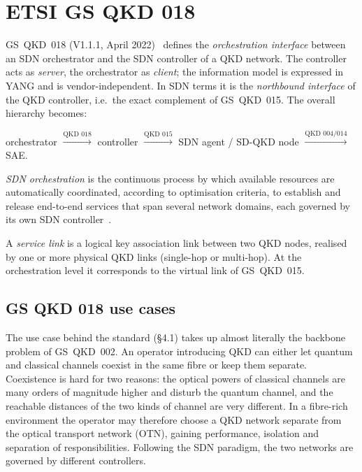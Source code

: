 \section{ETSI GS QKD 018}
\label{sec:qkd018}

GS~QKD~018 (V1.1.1, April 2022)~\cite{qkd018} defines the
\emph{orchestration interface} between an SDN orchestrator and the SDN
controller of a QKD network. The controller acts as \emph{server}, the
orchestrator as \emph{client}; the information model is expressed in YANG
and is vendor-independent. In SDN terms it is the \emph{northbound
interface} of the QKD controller, i.e.\ the exact complement of
GS~QKD~015. The overall hierarchy becomes:
\begin{center}
\small
orchestrator $\xrightarrow{\text{QKD 018}}$ controller
$\xrightarrow{\text{QKD 015}}$ SDN agent / SD-QKD node
$\xrightarrow{\text{QKD 004/014}}$ SAE.
\end{center}

\begin{definition}
\emph{SDN orchestration} is the continuous process by which available
resources are automatically coordinated, according to optimisation
criteria, to establish and release end-to-end services that span several
network domains, each governed by its own SDN
controller~\cite[§4.2]{qkd018}.
\end{definition}

\begin{definition}
A \emph{service link} is a logical key association link between two QKD
nodes, realised by one or more physical QKD links (single-hop or
multi-hop). At the orchestration level it corresponds to the virtual link
of GS~QKD~015.
\end{definition}



\subsection{GS QKD 018 use cases}
\label{sec:usecase018}

The use case behind the standard (§4.1) takes up almost literally the
backbone problem of GS~QKD~002. An operator introducing QKD can either let
quantum and classical channels coexist in the same fibre or keep them
separate. Coexistence is hard for two reasons: the optical powers of
classical channels are many orders of magnitude higher and disturb the
quantum channel, and the reachable distances of the two kinds of channel
are very different. In a fibre-rich environment the operator may therefore
choose a QKD network separate from the optical transport network (OTN),
gaining performance, isolation and separation of responsibilities.
Following the SDN paradigm, the two networks are governed by different
controllers.


